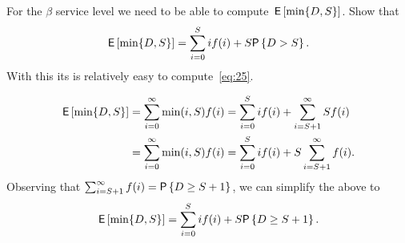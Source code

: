 \begin{exercise}
For the $\beta$ service level we need to be able to compute  $\,\mathsf{E}\left[\min\{D,S\}\right]$. Show that
\begin{equation*}
  \E{\min\{D,\Q\}} = \sum_{i=0}^\Q i\/ f(i) + \Q\/\P{D> \Q}.
\end{equation*}
With this its is relatively easy to compute~\eqref{eq:25}. 
  \begin{solution}
\begin{align*}
  \,\mathsf{E}\left[\min\{D,S\}\right] 
&= \sum_{i=0}^\infty \min(i,S)f(i) = \sum_{i=0}^S i f(i) + \sum_{i=S+1}^\infty S f(i) \\
&= \sum_{i=0}^\infty \min(i,S)f(i) = \sum_{i=0}^S i f(i) + S \sum_{i=S+1}^\infty f(i).
\end{align*}
Observing that $\sum_{i=\Q+1}^\infty f(i)=\P{D\geq \Q+1}$,  we can simplify the above to
\begin{equation*}
  \E{\min\{D,\Q\}} = \sum_{i=0}^\Q i\/ f(i) + \Q\/\P{D\geq \Q+1}.
\end{equation*}
  \end{solution}
\end{exercise}



